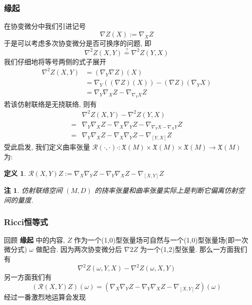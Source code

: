 \documentclass{book}
\newtheorem{definition}[theorem]{\indent 定义}
\newtheorem*{remark}{\indent 注}
\begin{document}
    \subsubsection{缘起}
        在协变微分中我们引进记号
        \begin{equation*}
            \nabla Z(X) :=\nabla_X{Z}
        \end{equation*}
        于是可以考虑多次协变微分是否可换序的问题, 即
        \begin{equation*}
            \nabla^2Z(X,Y) \stackrel{?}{=} \nabla^2Z(Y,X)
        \end{equation*}
        我们仔细地将等号两侧的式子展开
        \begin{align*}
            \nabla^2Z(X,Y) &= (\nabla_Y\nabla Z)(X) \\
            &= \nabla_Y((\nabla Z)(X)) - (\nabla Z)(\nabla_Y{X}) \\
            &= \nabla_Y\nabla_X{Z}-\nabla_{\nabla_Y{X}}Z
        \end{align*}
        若该仿射联络是无挠联络, 则有
        \begin{align*}
            & \nabla^2Z(X,Y) - \nabla^2Z(Y,X) \\
            =& \nabla_Y\nabla_X{Z}-\nabla_X\nabla_Y{Z}-\nabla_{\nabla_Y{X}-\nabla_X{Y}}Z \\
            =& \nabla_Y\nabla_X{Z}-\nabla_X\nabla_Y{Z}-\nabla_{[Y,X]}Z
        \end{align*}
        受此启发, 我们定义曲率张量 $\mathcal{R}(\cdot,\cdot)\cdot:\mathfrak{X}(M)\times\mathfrak{X}(M)\times\mathfrak{X}(M)\rightarrow\mathfrak{X}(M)$ 为:
        \begin{definition}
            $\mathcal{R}(X,Y)Z := \nabla_X\nabla_Y{Z} - \nabla_Y\nabla_X{Z} - \nabla_{[X,Y]}Z$
        \end{definition}
        
        \begin{remark}
            仿射联络空间 $(M,D)$ 的挠率张量和曲率张量实际上是判断它偏离仿射空间的量度.
        \end{remark}

    \subsubsection{Ricci恒等式}
    回顾 \textbf{缘起} 中的内容, $Z$ 作为一个(1,0)型张量场可自然与一个(1,0)型张量场(即一次微分式) $\omega$ 做配合. 因为两次协变微分后 $\nabla2{Z}$ 为一个(1,2)型张量. 
    那么一方面我们有
    \begin{equation*}
        \nabla^2Z(\omega,Y,X) - \nabla^2Z(\omega,X,Y)
    \end{equation*}
    另一方面我们有
    \begin{equation*}
        (\mathcal{R}(X,Y)Z)(\omega) = (\nabla_X\nabla_Y{Z} - \nabla_Y\nabla_X{Z}-\nabla_{[X,Y]}{Z})(\omega)
    \end{equation*}
    经过一番激烈地运算会发现
    
\end{document}
